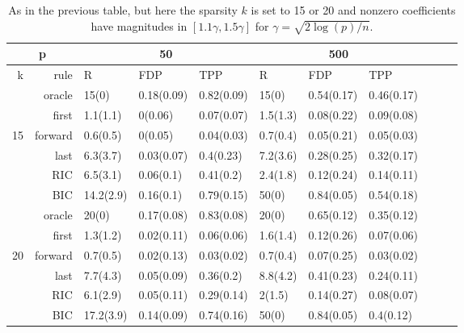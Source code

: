 
\begin{table}[ht]
\centering
\begin{tabular}{|r|r|lll|lll|lll|}
 \hline
   \multicolumn{2}{|c|}{p} & \multicolumn{3}{c|}{50}  & \multicolumn{3}{c|}{500} \\ 
  \hline \hline
    k & rule  &  R        & FDP        &  TPP          &   R      & FDP        & TPP \\ 
  \hline
   & oracle  & 15(0)     & 0.18(0.09) & 0.82(0.09)  & 15(0) & 0.54(0.17) & 0.46(0.17) \\
   & first   & 1.1(1.1)  & 0(0.06)    & 0.07(0.07)  & 1.5(1.3) & 0.08(0.22) & 0.09(0.08) \\
15 & forward & 0.6(0.5)  & 0(0.05)    & 0.04(0.03)  & 0.7(0.4) & 0.05(0.21) & 0.05(0.03) \\
   & last    & 6.3(3.7)  & 0.03(0.07) & 0.4(0.23)   & 7.2(3.6) & 0.28(0.25) & 0.32(0.17) \\
   & RIC     & 6.5(3.1)  & 0.06(0.1)  & 0.41(0.2)   & 2.4(1.8) & 0.12(0.24) & 0.14(0.11) \\
   & BIC     & 14.2(2.9) & 0.16(0.1)  & 0.79(0.15)  & 50(0) & 0.84(0.05) & 0.54(0.18) \\
  \hline
   & oracle  & 20(0)     & 0.17(0.08) & 0.83(0.08)  & 20(0) & 0.65(0.12) & 0.35(0.12) \\
   & first   & 1.3(1.2)  & 0.02(0.11) & 0.06(0.06)  & 1.6(1.4) & 0.12(0.26) & 0.07(0.06) \\
20 & forward & 0.7(0.5)  & 0.02(0.13) & 0.03(0.02)  & 0.7(0.4) & 0.07(0.25) & 0.03(0.02) \\
   & last    & 7.7(4.3)  & 0.05(0.09) & 0.36(0.2)   & 8.8(4.2) & 0.41(0.23) & 0.24(0.11) \\
   & RIC     & 6.1(2.9)  & 0.05(0.11) & 0.29(0.14)  & 2(1.5) & 0.14(0.27) & 0.08(0.07) \\ 
   & BIC     & 17.2(3.9) & 0.14(0.09) & 0.74(0.16)  & 50(0) & 0.84(0.05) & 0.4(0.12) \\ 

  \hline
\end{tabular}
\caption{As in the previous table, but here the sparsity $k$ is set to 15 or 20
  and nonzero coefficients have magnitudes in $[1.1\gamma, 1.5\gamma]$ for
  $\gamma = \sqrt{2\log(p)/n}$. }
\label{tab:hard}
\end{table}

